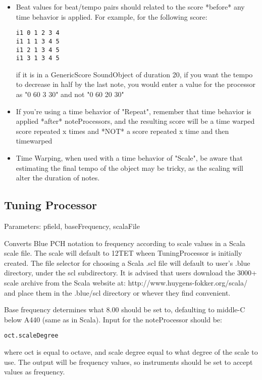 \begin{itemize}
\item
  Beat values for beat/tempo pairs should related to the score *before*
  any time behavior is applied. For example, for the following score:

\begin{verbatim}
i1 0 1 2 3 4
i1 1 1 3 4 5 
i1 2 1 3 4 5 
i1 3 1 3 4 5 
\end{verbatim}

  if it is in a GenericScore SoundObject of duration 20, if you want the
  tempo to decrease in half by the last note, you would enter a value
  for the processor as "0 60 3 30" and not "0 60 20 30"
\item
  If you're using a time behavior of "Repeat", remember that time
  behavior is applied *after* noteProcessors, and the resulting score
  will be a time warped score repeated x times and *NOT* a score
  repeated x time and then timewarped
\item
  Time Warping, when used with a time behavior of "Scale", be aware that
  estimating the final tempo of the object may be tricky, as the scaling
  will alter the duration of notes.
\end{itemize}


\subsection{Tuning Processor}\label{tuningProcessor}

Parameters: pfield, baseFrequency, scalaFile

Converts Blue PCH notation to frequency according to scale values in a
Scala scale file. The scale will default to 12TET wheen TuningProcessor
is initially created. The file selector for choosing a Scala .scl file
will default to user's .blue directory, under the scl subdirectory. It
is advised that users download the 3000+ scale archive from the Scala
website at: http://www.huygens-fokker.org/scala/ and place them in the
.blue/scl directory or whever they find convenient.

Base frequency determines what 8.00 should be set to, defaulting to
middle-C below A440 (same as in Scala). Input for the noteProcessor
should be:

\begin{verbatim}
oct.scaleDegree
\end{verbatim}

where oct is equal to octave, and scale degree equal to what degree of
the scale to use. The output will be frequency values, so instruments
should be set to accept values as frequency.


